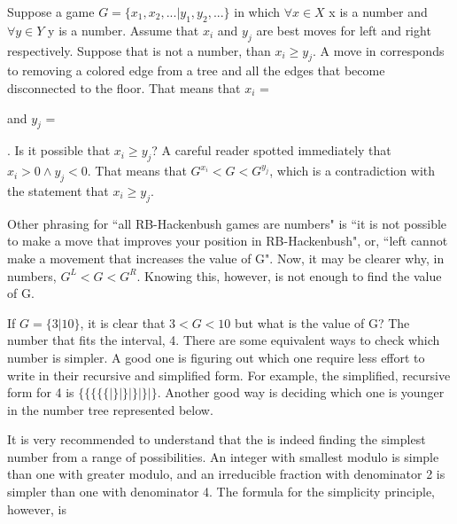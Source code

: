 Suppose a game $G = \{x_1, x_2,... | y_1, y_2, ...\}$ in which $\forall x \in X$ x  is a number and $\forall y \in Y$ y is a number. Assume that $x_i$ and $y_j$ are best moves for left and right respectively. Suppose that \Gm{} is not a number, than $x_i \ge y_j$. A move in \Gm corresponds to removing a colored edge from a tree and all the edges that become disconnected to the floor. That means that $x_i$ = 
 and $y_j$ =
. Is it possible that $x_i \ge y_j$? A careful reader spotted immediately that $x_i > 0 \land y_j < 0$. That means that $G^{x_i} < G < G^{y_j}$, which is a contradiction with the statement that $x_i \ge y_j$.

Other phrasing for ``all RB-Hackenbush games are numbers" is ``it is not possible to make a move that improves your position in  RB-Hackenbush", or, ``left cannot make a movement that increases the value of G". Now, it may be clearer why, in numbers, $G^L < G < G^R$. Knowing this, however, is not enough to find the value of G.

If $G = \{3 | 10\}$, it is clear that $3 < G < 10$ but what is the value of G? The  number that fits the interval, 4. There are some equivalent ways to check which number is simpler. A good one is figuring out which one require less effort to write in their recursive and simplified form. For example, the simplified, recursive form for 4 is $\{\{\{\{\{|\}|\}|\}|\} | \}$. Another good way is deciding which one is younger in the number tree represented below.



It is very recommended to understand that the  is indeed finding the simplest number from a range of possibilities. An integer with smallest modulo is simple than one with greater modulo, and an irreducible fraction with denominator 2 is simpler than one with denominator 4. The formula for the simplicity principle, however, is 

